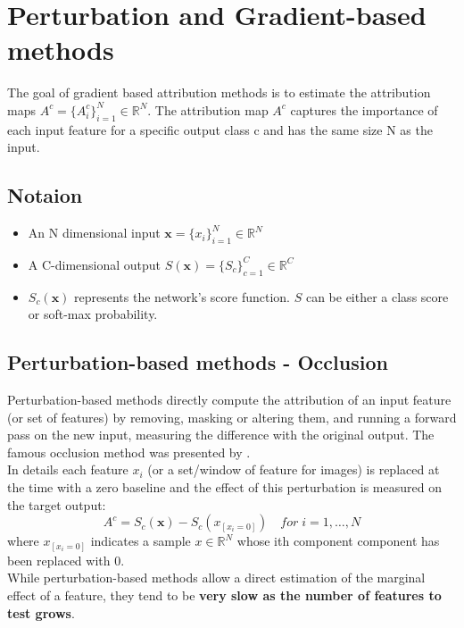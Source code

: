 \section{Perturbation and Gradient-based methods}
The goal of gradient based attribution methods is to estimate the attribution maps $A^c=\{A_i^c\}^N_{i=1}\in \mathbb{R}^N$.
The attribution map $A^c$ captures the importance of each input feature for a specific output class c and has the
same size N as the input.

\subsection{Notaion}
\begin{itemize}
    \item An N dimensional input $\bm{x}=\{x_i\}_{i=1}^N \in \mathbb{R}^N$
    \item A C-dimensional output $S(\bm{x})=\{S_c\}_{c=1}^C \in \mathbb{R}^C$
    \item $S_c(\bm{x})$ represents the network's score function. $S$ can be either a class score or soft-max probability.
\end{itemize}

\subsection{Perturbation-based methods - Occlusion}
Perturbation-based methods directly compute the attribution of an input feature (or set of features) by removing, masking or altering them, and running a forward pass on the new input, measuring the difference with the original output.
The famous occlusion method was presented by \cite{DBLP:conf/eccv/ZeilerF14}. \\
In details each feature $x_i$ (or a set/window of feature for images) is replaced at the time with a zero baseline and the effect of this perturbation is measured 
on the target output:
\begin{equation*}
    A^c = S_c(\bm{x})-S_c(x_{[x_i=0]}) \quad for\; i = 1, \ldots, N
\end{equation*}
where $x_{[x_i=0]}$ indicates a sample $x\in\mathbb{R}^N$ whose ith component component has been replaced with 0.\\

While perturbation-based methods allow a direct estimation of the marginal effect of a feature, they tend to be \textbf{very slow as the number of features to test grows}.\\

